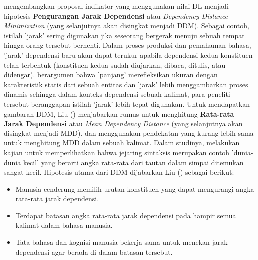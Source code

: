 \cite{liu2017dependency} mengembangkan proposal indikator yang menggunakan nilai DL menjadi hipotesis \textbf{Pengurangan Jarak Dependensi} atau \textit{Dependency Distance Minimization} (yang selanjutnya akan disingkat menjadi DDM). Sebagai contoh, istilah 'jarak' sering digunakan jika seseorang bergerak menuju sebuah tempat hingga orang tersebut berhenti. Dalam proses produksi dan pemahaman bahasa, 'jarak' dependensi baru akan dapat terukur apabila dependensi kedua konstituen telah terbentuk (konstituen kedua sudah diujarkan, dibaca, ditulis, atau didengar). \cite{liu2017dependency} berargumen bahwa 'panjang' merefleksikan ukuran dengan karakteristik statis dari sebuah entitas dan 'jarak' lebih menggambarkan proses dinamis sehingga dalam konteks dependensi sebuah kalimat, para peneliti tersebut beranggapan istilah 'jarak' lebih tepat digunakan. Untuk mendapatkan gambaran DDM, Liu (\citealp{liu2008dependency, liu2017dependency}) menjabarkan rumus untuk menghitung \textbf{Rata-rata Jarak Dependensi} atau \textit{Mean Dependency Distance} (yang selanjutnya akan disingkat menjadi MDD). \cite{hudson2010introduction} dan \cite{i2004euclidean} menggunakan pendekatan yang kurang lebih sama untuk menghitung MDD dalam sebuah kalimat. Dalam studinya, \cite{i2004patterns} melakukan kajian untuk memperlihatkan bahwa jejaring sintaksis merupakan contoh 'dunia-dunia kecil' yang berarti angka rata-rata dari tautan dalam simpai ditemukan sangat kecil. Hipotesis utama dari DDM dijabarkan Liu (\citealp{liu2008dependency, liu2017dependency}) sebagai berikut:

\begin{itemize}
\item Manusia cenderung memilih urutan konstituen yang dapat mengurangi angka rata-rata jarak dependensi.
\item Terdapat batasan angka rata-rata jarak dependensi pada hampir semua kalimat dalam bahasa manusia.
\item Tata bahasa dan kognisi manusia bekerja sama untuk menekan jarak dependensi agar berada di dalam batasan tersebut.
\end{itemize}


